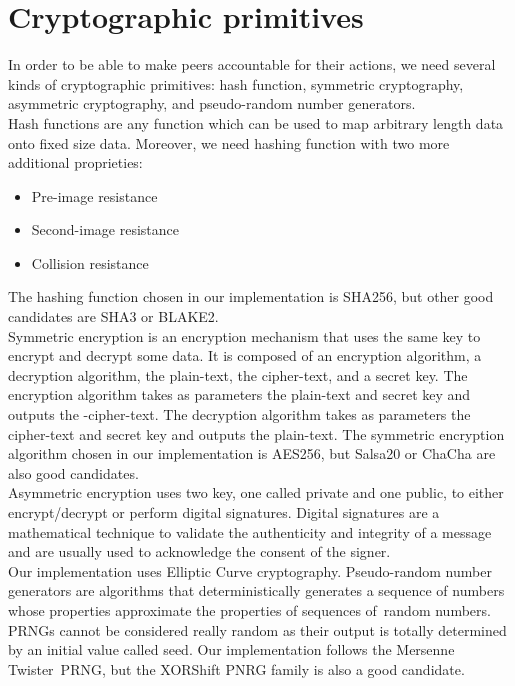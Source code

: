 \documentclass[mscthesis]{usiinfthesis}
\begin{document}
\section{Cryptographic primitives}
In order to be able to make peers accountable for their actions, we need several kinds of cryptographic primitives: hash function, symmetric cryptography, asymmetric cryptography, and pseudo-random number generators. \\
Hash functions are any function which can be used to map arbitrary length data onto fixed size data. Moreover, we need hashing function with two more additional proprieties:
\begin{itemize}
	\item Pre-image resistance
	\item Second-image resistance
	\item Collision resistance
\end{itemize}
The hashing function chosen in our implementation is SHA256, but other good candidates are SHA3 or BLAKE2. \\
Symmetric encryption is an encryption mechanism that uses the same key to encrypt and decrypt some data. It is composed of an encryption algorithm, a decryption algorithm, the plain-text, the cipher-text, and a secret key. The encryption algorithm takes as parameters the plain-text and secret key and outputs the -cipher-text. The decryption algorithm takes as parameters the cipher-text and secret key and outputs the plain-text. The symmetric encryption algorithm chosen in our implementation is AES256, but Salsa20 or ChaCha are also good candidates. \\
Asymmetric encryption uses two key, one called private and one public, to either encrypt/decrypt or perform digital signatures. Digital signatures are a mathematical technique to validate the authenticity and integrity of a message and are usually used to acknowledge the consent of the signer.  \\
Our implementation uses Elliptic Curve cryptography.
Pseudo-random number generators are algorithms that deterministically generates a sequence of numbers whose properties approximate the properties of sequences of random numbers. PRNGs cannot be considered really random as their output is totally determined by an initial value called seed. Our implementation follows the Mersenne Twister PRNG, but the XORShift PNRG family is also a good candidate.
\end{document}
